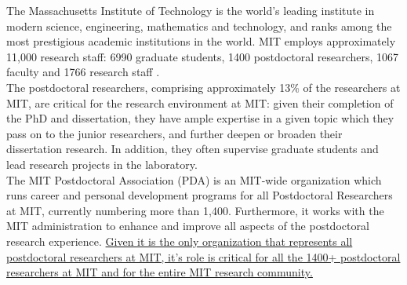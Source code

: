 \documentclass[11pt]{article}
\begin{document}
The Massachusetts Institute of Technology is the world's leading institute in modern science, engineering, mathematics and technology, and ranks among the most prestigious academic institutions in the world. MIT employs approximately 11,000 research staff: 6990 graduate students, 1400 postdoctoral researchers, 1067 faculty and 1766 research staff \cite{pdaleader}. \\ 

The postdoctoral researchers, comprising approximately 13\% of the researchers at MIT, are critical for the research environment at MIT: given their completion of the PhD and dissertation, they have ample expertise in a given topic which they pass on to the junior researchers, and further deepen or broaden their dissertation research. In addition, they often supervise graduate students and lead research projects in the laboratory.\\

The MIT Postdoctoral Association (PDA) is an MIT-wide organization which runs career and personal development programs for all Postdoctoral Researchers at MIT, currently numbering more than 1,400. Furthermore, it works with the MIT administration to enhance and improve all aspects of the postdoctoral research experience. \ul{Given it is the only organization that represents all postdoctoral researchers at MIT, it's role is critical for all the 1400+ postdoctoral researchers at MIT and for the entire MIT research community.}  \\
 \eb
\end{document}

